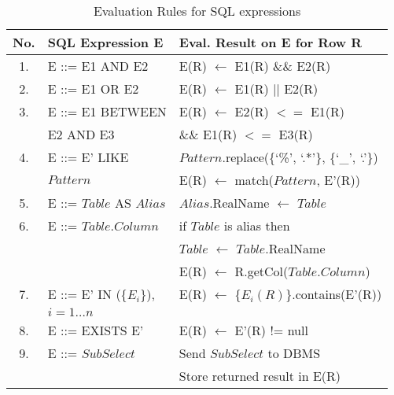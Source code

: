 \begin{table}[t]
    \centering 
    \small
    \caption{Evaluation Rules for SQL expressions}\label{tab:transformation-rules}
\begin{tabular}{@{}cll@{}}
    \toprule
    \textbf{No.} & \textbf{SQL Expression E} & \textbf{Eval. Result on E for Row R} \\
    \midrule
    1.  & E ::= E1 AND E2     &   E(R) $\leftarrow$ E1(R) \&\& E2(R) \\
    \midrule
    2.  & E ::= E1 OR E2      &   E(R) $\leftarrow$ E1(R) $||$ E2(R) \\
    \midrule
    3.  & E ::= E1 BETWEEN    &   E(R) $\leftarrow$ E2(R) $<=$ E1(R)  \\
        & \hspace{30pt} E2 AND E3       & \hspace{30pt} \&\& E1(R) $<=$ E3(R) \\
    \midrule
    4.  & E ::= E' LIKE               &   $Pattern$.replace(\{`\%', `.*'\}, \{`\_', `.'\}) \\
        & \hspace{30pt} $Pattern$     &   E(R) $\leftarrow$ match($Pattern$, E'(R)) \\
    \midrule
    5.  & E ::= $Table$ AS $Alias$   & $Alias$.RealName $\leftarrow$ $Table$ \\
    \midrule
    6.  & E ::= $Table$.$Column$      &   if $Table$ is alias then \\
        &                               &   \hspace{15pt}$Table$ $\leftarrow$ $Table$.RealName \\
        &                              & E(R) $\leftarrow$ R.getCol($Table$.$Column$) \\
    \midrule
    7.  & E ::= E' IN (\{$E_i$\}),    &   E(R) $\leftarrow$ \{$E_i(R)$\}.contains(E'(R)) \\
        & \hspace{30pt} $i = 1 \ldots n$ \\
    \midrule
    8.  & E ::= EXISTS E'             &   E(R) $\leftarrow$ E'(R) != null \\
    \midrule
    9. & E ::= $SubSelect$          &   Send $SubSelect$ to DBMS \\
       &                            &   Store returned result in E(R) \\
    \bottomrule
\end{tabular}
\end{table}
